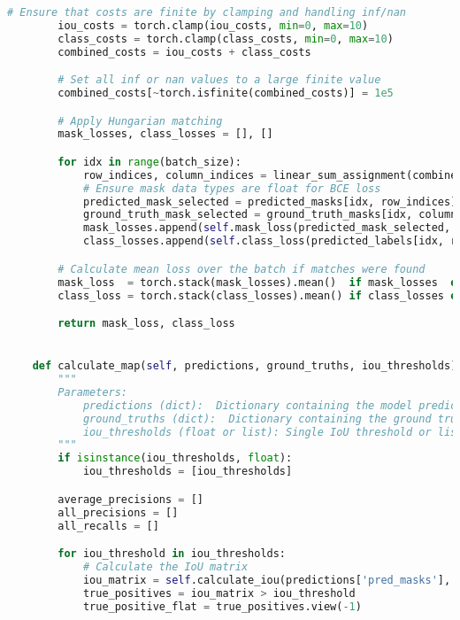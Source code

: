 \begin{lstlisting}[language=Python, caption=Extended Masked-Attention Mask Transformer Model Class]
        # Ensure that costs are finite by clamping and handling inf/nan
        iou_costs = torch.clamp(iou_costs, min=0, max=10)
        class_costs = torch.clamp(class_costs, min=0, max=10)
        combined_costs = iou_costs + class_costs

        # Set all inf or nan values to a large finite value
        combined_costs[~torch.isfinite(combined_costs)] = 1e5  

        # Apply Hungarian matching
        mask_losses, class_losses = [], []

        for idx in range(batch_size):
            row_indices, column_indices = linear_sum_assignment(combined_costs[idx].cpu().detach().numpy())
            # Ensure mask data types are float for BCE loss
            predicted_mask_selected = predicted_masks[idx, row_indices].float()
            ground_truth_mask_selected = ground_truth_masks[idx, column_indices].float()
            mask_losses.append(self.mask_loss(predicted_mask_selected, ground_truth_mask_selected).mean())
            class_losses.append(self.class_loss(predicted_labels[idx, row_indices], ground_truth_classes[idx, column_indices]))

        # Calculate mean loss over the batch if matches were found
        mask_loss  = torch.stack(mask_losses).mean()  if mask_losses  else torch.tensor(0.0, device=self.device)
        class_loss = torch.stack(class_losses).mean() if class_losses else torch.tensor(0.0, device=self.device)

        return mask_loss, class_loss


    def calculate_map(self, predictions, ground_truths, iou_thresholds):
        """
        Parameters:
            predictions (dict):  Dictionary containing the model predictions for bounding boxes, classes, and masks.
            ground_truths (dict):  Dictionary containing the ground truth for bounding boxes, classes, and masks.
            iou_thresholds (float or list): Single IoU threshold or list of IoU thresholds.
        """
        if isinstance(iou_thresholds, float):
            iou_thresholds = [iou_thresholds]

        average_precisions = []
        all_precisions = []
        all_recalls = []

        for iou_threshold in iou_thresholds:
            # Calculate the IoU matrix
            iou_matrix = self.calculate_iou(predictions['pred_masks'], ground_truths['masks'])
            true_positives = iou_matrix > iou_threshold
            true_positive_flat = true_positives.view(-1)


\end{lstlisting}
